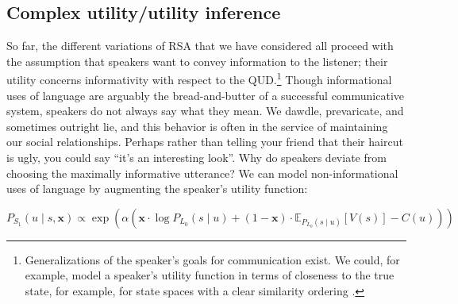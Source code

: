 \documentclass{sp}
\begin{document}
\subsection{Complex utility/utility inference}
\label{sec:compl-util-infer}
 
 So far, the different variations of RSA that we have considered all proceed with the assumption that speakers want to convey information to the listener; their utility concerns informativity with respect to the QUD.\footnote{Generalizations of the speaker's goals for communication exist. We could, for example, model a speaker's utility function in terms of closeness to the true state, for example, for state spaces with a clear similarity ordering \citep{Franke2014:Typical-use-of-}.} Though informational uses of language are arguably the bread-and-butter of a successful communicative system, speakers do not always say what they mean. We dawdle, prevaricate, and sometimes outright lie, and this behavior is often in the service of maintaining our social relationships. Perhaps rather than telling your friend that their haircut is ugly, you could say ``it's an interesting look''. Why do speakers deviate from choosing the maximally informative utterance? We can model non-informational uses of language by augmenting the speaker's utility function: 
  
 \begin{equation} \label{S1-polite}
P_{S_1}(u \mid s, \textbf{x}) \propto \exp (\alpha  (
 \textbf{x} \cdot \log P_{L_0}(s \mid u) +
 (1 - \textbf{x}) \cdot  \mathbb{E}_{P_{L_0}(s \mid u)}[V(s)] - C(u)))
\end{equation}
\end{document}
